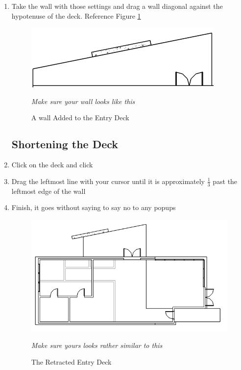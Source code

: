 \documentclass{tufte-book} %
\begin{document}
\begin{enumerate}
		\item Take the wall with those settings and drag a wall diagonal against the hypotenuse of the deck. Reference Figure \ref{fig:reventrywall}
		
		\begin{figure}
			\includegraphics[width=\linewidth]{revitentrywalkwalls.png}
			\caption{A wall Added to the Entry Deck}
			\emph{Make sure your wall looks like this}
			\label{fig:reventrywall}
		\end{figure}
		
	\subsection{Shortening the Deck}
		\item Click on the deck and click 
		\item Drag the leftmost line with your cursor until it is approximately \( \frac{1}{3} \) past the leftmost edge of the wall
		\item Finish, it goes without saying to say no to any popups
		
		\begin{figure}
			\includegraphics[width=\linewidth]{revitentrydeckretracted.png}
			\caption{The Retracted Entry Deck}
			\emph{Make sure yours looks rather similar to this}
			\label{fig:reventrydeckretract}
		\end{figure}
	

\end{enumerate}
\end{document}
